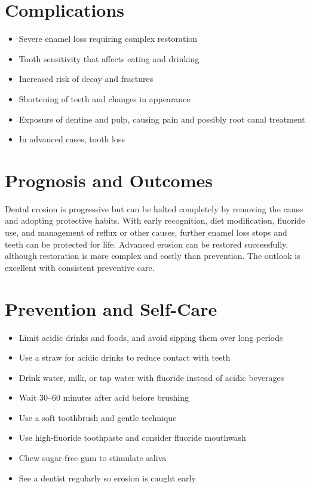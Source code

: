 \section*{Complications}
\begin{itemize}
    \item Severe enamel loss requiring complex restoration
    \item Tooth sensitivity that affects eating and drinking
    \item Increased risk of decay and fractures
    \item Shortening of teeth and changes in appearance
    \item Exposure of dentine and pulp, causing pain and possibly root canal treatment
    \item In advanced cases, tooth loss
\end{itemize}

\section*{Prognosis and Outcomes}
Dental erosion is progressive but can be halted completely by removing the cause and adopting protective habits. With early recognition, diet modification, fluoride use, and management of reflux or other causes, further enamel loss stops and teeth can be protected for life. Advanced erosion can be restored successfully, although restoration is more complex and costly than prevention. The outlook is excellent with consistent preventive care.

\section*{Prevention and Self-Care}
\begin{itemize}
    \item Limit acidic drinks and foods, and avoid sipping them over long periods
    \item Use a straw for acidic drinks to reduce contact with teeth
    \item Drink water, milk, or tap water with fluoride instead of acidic beverages
    \item Wait 30--60 minutes after acid before brushing
    \item Use a soft toothbrush and gentle technique
    \item Use high-fluoride toothpaste and consider fluoride mouthwash
    \item Chew sugar-free gum to stimulate saliva
    \item See a dentist regularly so erosion is caught early
\end{itemize}

